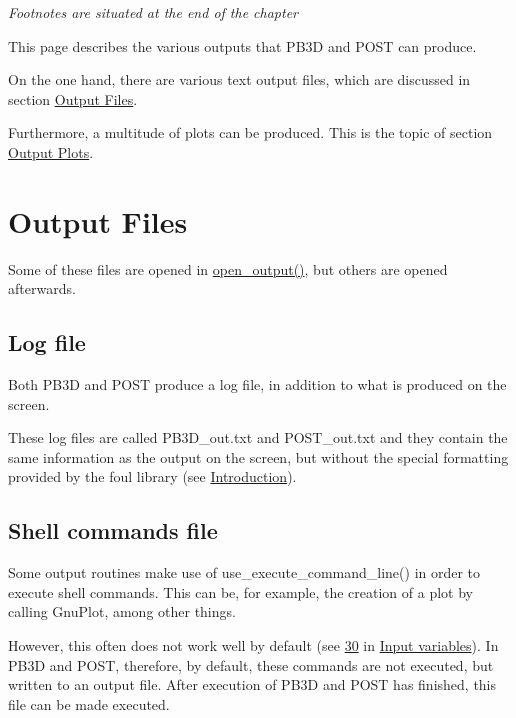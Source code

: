  
    \textit{\scriptsize Footnotes are situated at the end of the chapter}


This page describes the various outputs that P\+B3D and P\+O\+ST can produce.

On the one hand, there are various text output files, which are discussed in section \hyperlink{page_outputs_output_files}{Output Files}.

Furthermore, a multitude of plots can be produced. This is the topic of section \hyperlink{page_outputs_output_plots}{Output Plots}.\hypertarget{page_outputs_output_files}{}\section{Output Files}\label{page_outputs_output_files}
Some of these files are opened in \hyperlink{namespacefiles__ops_ad681a9e8083a6f664cf0f9d17ebe279c}{open\+\_\+output()}, but others are opened afterwards.\hypertarget{page_outputs_output_file_log}{}\subsection{Log file}\label{page_outputs_output_file_log}
Both P\+B3D and P\+O\+ST produce a log file, in addition to what is produced on the screen.

These log files are called {\ttfamily P\+B3\+D\+\_\+out.\+txt} and {\ttfamily P\+O\+S\+T\+\_\+out.\+txt} and they contain the same information as the output on the screen, but without the special formatting provided by the foul library (see \hyperlink{page_installation_installation_introduction}{Introduction}).\hypertarget{page_outputs_output_file_shell}{}\subsection{Shell commands file}\label{page_outputs_output_file_shell}
Some output routines make use of use\+\_\+execute\+\_\+command\+\_\+line() in order to execute shell commands. This can be, for example, the creation of a plot by calling Gnu\+Plot, among other things.

However, this often does not work well by default (see \hyperlink{page_inputs_fni30}{30} in \hyperlink{page_inputs}{Input variables}). In P\+B3D and P\+O\+ST, therefore, by default, these commands are not executed, but written to an output file. After execution of P\+B3D and P\+O\+ST has finished, this file can be made executed.

